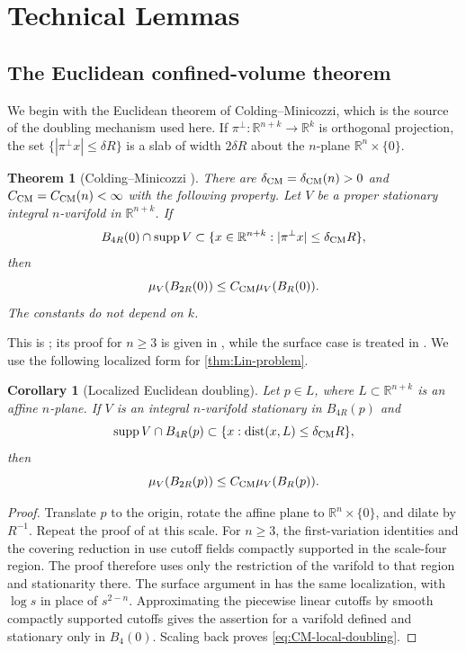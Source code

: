 \documentclass[11pt,reqno]{amsart}
\numberwithin{equation}{section}
\newtheorem{theorem}{Theorem}[section]
\newtheorem{corollary}[corollary]{Corollary}
\theoremstyle{definition}
\theoremstyle{remark}
\newcommand{\R}{\mathbb R}
\newcommand{\supp}{\operatorname{supp}}
\newcommand{\dist}{\operatorname{dist}}
\begin{document}
\section{Technical Lemmas}\label{sec:technical}

\subsection{The Euclidean confined-volume theorem}

We begin with the Euclidean theorem of Colding--Minicozzi, which is the source
of the doubling mechanism used here.  If
$\pi^\perp:\R^{n+k}\to\R^k$ is orthogonal projection, the set
$\{|\pi^\perp x|\le\delta R\}$ is a slab of width $2\delta R$ about the
$n$-plane $\R^n\times\{0\}$.  

\begin{theorem}[Colding--Minicozzi \cite{ColdingMinicozzi}]
\label{thm:CM-doubling}
There are $\delta_{\rm CM}=\delta_{\rm CM}(n)>0$ and
$C_{\rm CM}=C_{\rm CM}(n)<\infty$ with the following property.  Let $V$ be a
proper stationary integral $n$-varifold in $\R^{n+k}$.  If
\[
 B_{4R}(0)\cap\supp V
 \subset\{x\in\R^{n+k}:|\pi^\perp x|\le\delta_{\rm CM}R\},
\]
then
\[
 \mu_V(B_{2R}(0))\le C_{\rm CM}\mu_V(B_R(0)).
\]
The constants do not depend on $k$.
\end{theorem}

This is \cite[Theorem~0.5]{ColdingMinicozzi}; its proof for $n\ge3$ is given
in \cite[Section~1]{ColdingMinicozzi}, while the surface case is treated in
\cite[Section~6.1]{ColdingMinicozzi}.  We use the following localized form
for \cref{thm:Lin-problem}.

\begin{corollary}[Localized Euclidean doubling]
\label{cor:CM-local}
Let $p\in L$, where $L\subset\R^{n+k}$ is an affine $n$-plane.  If $V$ is
an integral $n$-varifold stationary in $B_{4R}(p)$ and
\[
 \supp V\cap B_{4R}(p)
 \subset\{x:\dist(x,L)\le\delta_{\rm CM}R\},
\]
then
\begin{equation}\label{eq:CM-local-doubling}
 \mu_V(B_{2R}(p))\le C_{\rm CM}\mu_V(B_R(p)).
\end{equation}
\end{corollary}

\begin{proof}
Translate $p$ to the origin, rotate the affine plane to
$\R^n\times\{0\}$, and dilate by $R^{-1}$.  Repeat the proof of
\cite[Theorem~0.5]{ColdingMinicozzi} at this scale.  For $n\ge3$, the
first-variation identities and the covering reduction in
\cite[Section~1]{ColdingMinicozzi} use cutoff fields compactly supported in
the scale-four region.  The proof therefore uses only the restriction of the
varifold to that region and stationarity there.  The surface argument in
\cite[Section~6.1]{ColdingMinicozzi} has the same localization, with $\log s$
in place of $s^{2-n}$.  Approximating the piecewise linear cutoffs by smooth
compactly supported cutoffs gives the assertion for a varifold defined and
stationary only in $B_4(0)$.  Scaling back proves
\eqref{eq:CM-local-doubling}.
\end{proof}
\end{document}

